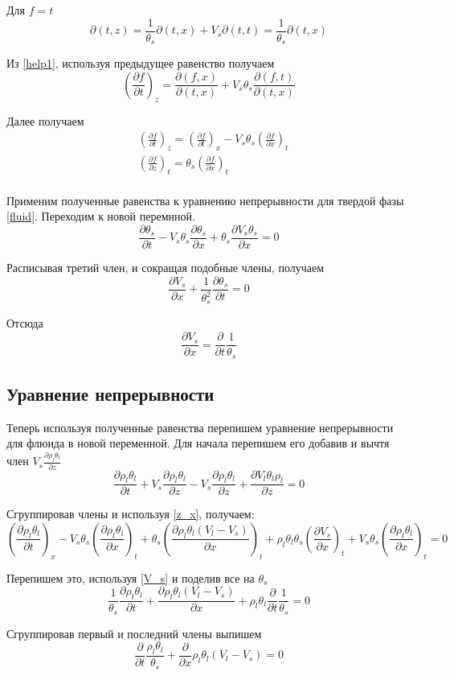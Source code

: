 \documentclass[12pt,a4paper]{article}
\newcommand{\pd}[2]{\frac{\partial #1}{\partial #2}}
\begin{document}
Для $ f = t $ 
$$
\partial(t , z) = \frac{1}{\theta_s} \partial(t , x) + V_s \partial(t , t) = \frac{1}{\theta_s} \partial(t , x)
$$

Из \eqref{help1}, используя предыдущее равенство получаем
$$
\left(\pd{f}{t}\right)_z = \pd{(f , x)}{(t , x)} + V_s \theta_s\pd{(f ,t)}{(t , x)}
$$

Далее получаем
\begin{equation}
\begin{aligned}
&\left(\pd{f}{t}\right)_z = \left(\pd{f}{t}\right)_x - V_s\theta_s\left(\pd{f}{x}\right)_t\\
&\left(\pd{f}{z}\right)_t = \theta_s\left(\pd{f}{x}\right)_t\\
\end{aligned}
\label{z_x}
\end{equation}

Применим полученные равенства к уравнению непрерывности для твердой фазы \eqref{fluid}. Переходим к новой перемнной.
$$
\pd{\theta_s}{t} - V_s\theta_s\pd{\theta_s}{x} + \theta_s\pd{V_s\theta_s}{x} =0
$$

Расписывая третий член, и сокращая подобные члены, получаем
$$
\pd{V_s}{x} + \frac{1}{\theta_s^2}\pd{\theta_s}{t} = 0
$$

Отсюда
\begin{equation}
\pd{V_s}{x} = \pd{}{t}\frac{1}{\theta_s}
\label{V_s}
\end{equation}
\subsection{Уравнение непрерывности}
Теперь используя полученные равенства перепишем уравнение непрерывности для флюида в новой переменной. Для начала перепишем его добавив и вычтя член $V_s\pd{\rho_l\theta_l}{z} $
$$
\pd{\rho_l\theta_l}{t} + V_s\pd{\rho_l\theta_l}{z} - V_s\pd{\rho_l\theta_l}{z} + \pd{V_l\theta_l\rho_l}{z} =0
$$

Сгруппировав члены и используя \eqref{z_x}, получаем:
$$
\left(\pd{\rho_l\theta_l}{t}\right)_x - V_s\theta_s \left(\pd{\rho_l\theta_l}{x}\right)_t + \theta_s\left(\pd{\rho_l\theta_l(V_l - V_s)}{x}\right)_t + \rho_l\theta_l\theta_s\left(\pd{V_s}{x}\right)_t + V_s\theta_s \left(\pd{\rho_l\theta_l}{x}\right)_t = 0
$$

Перепишем это, используя \eqref{V_s} и поделив все на $\theta_s$
$$
\frac{1}{\theta_s}\pd{\rho_l\theta_l}{t} + \pd{\rho_l\theta_l(V_l-V_s)}{x} + \rho_l\theta_l\pd{}{t}\frac{1}{\theta_s} = 0
$$

Сгруппировав первый и последний члены выпишем
\begin{equation}
\pd{}{t}\frac{\rho_l\theta_l}{\theta_s} + \pd{}{x}\rho_l\theta_l(V_l - V_s) = 0
\label{filtr_compr}
\end{equation}
\end{document}
